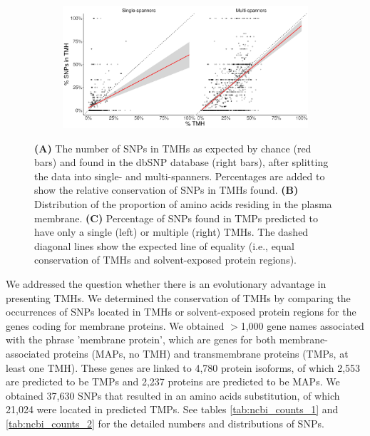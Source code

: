 \begin{figure}
  \vfill
  
  \begin{subfigure}[t]{\textwidth}
    \centering
    \caption{}
    \includegraphics[width=\linewidth]{ncbi_peregrine_results/fig_f_snps_found_and_expected_per_spanner.png}
    \label{fig:f_snps_found_and_expected_per_spanner}
  \end{subfigure}
  \caption{
      \textbf{(A)} 
      The number of SNPs in TMHs as expected by chance (red bars) 
      and found in the dbSNP database (right bars), 
      after splitting the data into single- and multi-spanners.
      Percentages are added to show the relative conservation
      of SNPs in TMHs found.
      \textbf{(B)} 
      Distribution of the proportion of amino acids residing
      in the plasma membrane.
      \textbf{(C)} 
      Percentage of SNPs found in TMPs predicted to have only a single
      (left) or multiple (right) TMHs.
      The dashed diagonal lines show the expected line of equality 
      (i.e., equal conservation of TMHs and solvent-exposed 
      protein regions).
  }
\end{figure}

We addressed the question whether there is an evolutionary advantage in presenting TMHs. We determined the conservation of TMHs by comparing the occurrences of SNPs located in TMHs or solvent-exposed protein regions for the genes coding for membrane proteins.
We obtained $>$1,000 gene names associated with the phrase 'membrane protein',
which are genes for both membrane-associated proteins (MAPs, no TMH) and 
transmembrane proteins (TMPs, at least one TMH).
These genes are linked to 4,780 protein isoforms, 
of which 2,553 are predicted to be TMPs and 
2,237 proteins are predicted to be MAPs.
We obtained 37,630 SNPs that resulted in an
amino acids substitution, of which 21,024 were located 
in predicted TMPs.
See tables \ref{tab:ncbi_counts_1} and \ref{tab:ncbi_counts_2} 
for the detailed numbers and distributions of SNPs.


